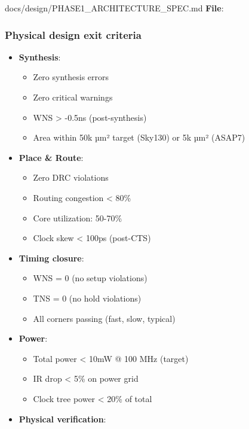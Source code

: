 \begin{relocated}{docs/design/PHASE1_ARCHITECTURE_SPEC.md}
\textbf{File}: 

\subsubsection{Physical design exit criteria}\label{ds:ch:phase1-architecture:physical-design-exit-criteria}

\begin{itemize}
\item
  \textbf{Synthesis}:

  \begin{itemize}
  \tightlist
  \item
    Zero synthesis errors
  \item
    Zero critical warnings
  \item
    WNS \textgreater{} -0.5ns (post-synthesis)
  \item
    Area within 50k µm² target (Sky130) or 5k µm² (ASAP7)
  \end{itemize}
\item
  \textbf{Place \& Route}:

  \begin{itemize}
  \tightlist
  \item
    Zero DRC violations
  \item
    Routing congestion \textless{} 80\%
  \item
    Core utilization: 50-70\%
  \item
    Clock skew \textless{} 100ps (post-CTS)
  \end{itemize}
\item
  \textbf{Timing closure}:

  \begin{itemize}
  \tightlist
  \item
    WNS = 0 (no setup violations)
  \item
    TNS = 0 (no hold violations)
  \item
    All corners passing (fast, slow, typical)
  \end{itemize}
\item
  \textbf{Power}:

  \begin{itemize}
  \tightlist
  \item
    Total power \textless{} 10mW @ 100 MHz (target)
  \item
    IR drop \textless{} 5\% on power grid
  \item
    Clock tree power \textless{} 20\% of total
  \end{itemize}
\item
  \textbf{Physical verification}:


\end{itemize}
\end{relocated}
